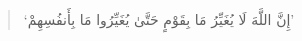 





\begin{quote}
    \begin{RLtext}
        `إِنَّ اللَّهَ لَا يُغَيِّرُ مَا بِقَوْمٍ حَتَّىٰ يُغَيِّرُوا مَا بِأَنفُسِهِمْ'
    \end{RLtext}
\end{quote}